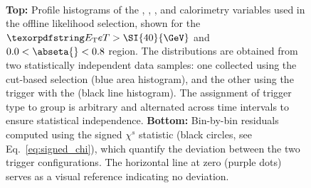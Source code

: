 \begin{figure}[h!]
\begin{center}
\begin{subfigure}[c]{.48\textwidth}
\end{subfigure} \\
\caption{%
\textbf{Top:} Profile histograms of the \reta, \rphi, \eratio, and \rhad calorimetry variables used in the offline likelihood selection, shown for the $\et>\SI{40}{\GeV}$ and $0.0<\abseta{}<0.8$ region. The distributions are obtained from two statistically independent data samples: one collected using the cut-based selection (blue area histogram), and the other using the trigger with the \rnn{} (black line histogram). The assignment of trigger type to group is arbitrary and alternated across time intervals to ensure statistical independence.
\textbf{Bottom:} Bin-by-bin residuals computed using the signed $\chi^s$ statistic (black circles, see Eq.~\ref{eq:signed_chi}), which quantify the deviation between the two trigger configurations. The horizontal line at zero (purple dots) serves as a visual reference indicating no deviation.
}
%
\label{fig:groups_homogeneity_calo}
\end{center}
\end{figure}%


\FloatBarrier
